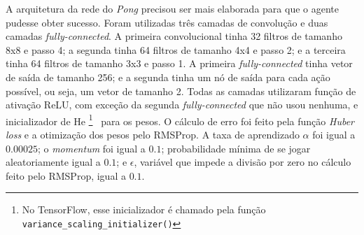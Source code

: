 A arquitetura da rede do \textit{Pong} precisou ser mais elaborada para que o agente pudesse obter sucesso.
Foram utilizadas três camadas de convolução e duas camadas \textit{fully-connected}.
A primeira convolucional tinha 32 filtros de tamanho 8x8 e passo 4; a segunda tinha 64 filtros de tamanho 4x4 e passo 2; e a terceira tinha 64 filtros de tamanho 3x3 e passo 1.
A primeira \textit{fully-connected} tinha vetor de saída de tamanho 256; e a segunda tinha um nó de saída para cada ação possível, ou seja, um vetor de tamanho 2.
Todas as camadas utilizaram função de ativação ReLU, com exceção da segunda \textit{fully-connected} que não usou nenhuma, e inicializador de He \footnote{No TensorFlow, esse inicializador é chamado pela função \texttt{variance\_scaling\_initializer()}}~\cite{DBLP:journals/corr/HeZR015} para os pesos.
O cálculo de erro foi feito pela função \textit{Huber loss} e a otimização dos pesos pelo RMSProp.
A taxa de aprendizado $\alpha$ foi igual a $0.00025$; o \textit{momentum} foi igual a $0.1$; probabilidade mínima de se jogar aleatoriamente igual a $0.1$; e $\epsilon$, variável que impede a divisão por zero no cálculo feito pelo RMSProp, igual a $0.1$.
